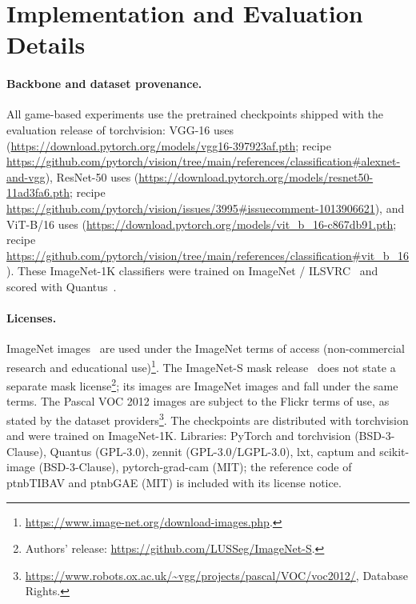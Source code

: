 \section{Implementation and Evaluation Details}\label{app:extended_protocol}

\paragraph{Backbone and dataset provenance.}
All game-based experiments use the pretrained checkpoints shipped with the evaluation release of torchvision: VGG-16 uses 
(\url{https://download.pytorch.org/models/vgg16-397923af.pth}; recipe
\url{https://github.com/pytorch/vision/tree/main/references/classification#alexnet-and-vgg}),
ResNet-50 uses 
(\url{https://download.pytorch.org/models/resnet50-11ad3fa6.pth}; recipe
\url{https://github.com/pytorch/vision/issues/3995#issuecomment-1013906621}), and ViT-B/16 uses
(\url{https://download.pytorch.org/models/vit_b_16-c867db91.pth}; recipe
\url{https://github.com/pytorch/vision/tree/main/references/classification#vit_b_16}). These ImageNet-1K classifiers were trained on ImageNet / ILSVRC~\parencite{Deng2009,Russakovsky2015ilsvrc} and scored with Quantus~\parencite{Hedstrom2023}.

\paragraph{Licenses.}\label{ptnb:app:licences}
ImageNet images~\parencite{Deng2009} are used under the ImageNet terms of access (non-commercial research and
educational use)\footnote{\url{https://www.image-net.org/download-images.php}.}. The ImageNet-S mask release~\parencite{gao2022luss} does not state a separate mask license\footnote{Authors' release: \url{https://github.com/LUSSeg/ImageNet-S}.}; its images are ImageNet images and fall under the same
terms. The Pascal VOC 2012 images are subject to the Flickr terms of use,
as stated by the dataset providers\footnote{\url{https://www.robots.ox.ac.uk/~vgg/projects/pascal/VOC/voc2012/}, Database Rights.}. The checkpoints are distributed with torchvision
and were trained on ImageNet-1K. Libraries: PyTorch and torchvision (BSD-3-Clause), Quantus
(GPL-3.0), zennit (GPL-3.0/LGPL-3.0), lxt, captum and scikit-image (BSD-3-Clause), pytorch-grad-cam
(MIT); the reference code of \acs{ptnbTIBAV} and \acs{ptnbGAE} (MIT) is included with its license notice.

